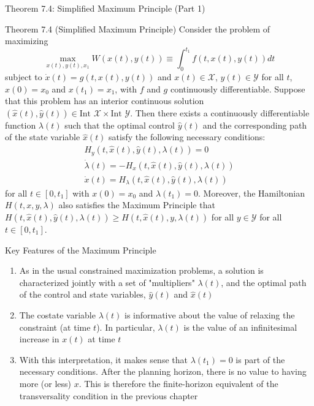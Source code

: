 \documentclass[9pt,aspectratio=169]{beamer}
\newcommand{\X}{\mathcal{X}}
\newcommand{\Y}{\mathcal{Y}}
\begin{document}
\begin{frame}{Theorem 7.4: Simplified Maximum Principle (Part 1)}
\begin{block}{Theorem 7.4 (Simplified Maximum Principle)}
    Consider the problem of maximizing 
    \begin{equation*}
        \max_{x(t),y(t),x_1} W(x(t), y(t)) \equiv \int_0^{t_1} f(t, x(t), y(t))dt    
    \end{equation*}
    subject to $\dot{x}(t) = g(t, x(t), y(t))$ and $x(t) \in \X$, $y(t) \in
    \Y$ for all $t$, $x(0) = x_0$ and $x(t_1) = x_1$, with $f$ and $g$
    continuously differentiable. Suppose that this problem has an interior
    continuous solution $(\hat{x}(t), \hat{y}(t)) \in \text{Int } \X \times
    \text{Int } \Y$. Then there exists a continuously differentiable function
    $\lambda(t)$ such that the optimal control $\hat{y}(t)$ and the
    corresponding path of the state variable $\hat{x}(t)$ satisfy the
    following necessary conditions:
    \begin{align*}
        H_y(t, \hat{x}(t), \hat{y}(t), \lambda(t)) = 0\\
        \dot{\lambda}(t) = -H_x(t, \hat{x}(t), \hat{y}(t), \lambda(t)) \\ 
        \dot{x}(t) = H_\lambda(t, \hat{x}(t), \hat{y}(t), \lambda(t))
    \end{align*}
    for all $t \in [0, t_1]$ with $x(0) = x_0$ and $\lambda(t_1) = 0$.
    Moreover, the Hamiltonian $H(t, x, y, \lambda)$ also satisfies the
    Maximum Principle that $H(t, \hat{x}(t), \hat{y}(t), \lambda(t)) \geq
    H(t, \hat{x}(t), y, \lambda(t))$ for all $y \in \Y$ for all $t \in [0,
    t_1]$.
\end{block}
\end{frame}

\begin{frame}{Key Features of the Maximum Principle}
\begin{enumerate}
    \item As in the usual constrained maximization problems, a solution is
    characterized jointly with a set of "multipliers" $\lambda(t)$, and the
    optimal path of the control and state variables, $\hat{y}(t)$ and
    $\hat{x}(t)$
    
    \item The costate variable $\lambda(t)$ is informative about the value of
    relaxing the constraint (at time $t$). In particular, $\lambda(t)$ is the
    value of an infinitesimal increase in $x(t)$ at time $t$
    
    \item With this interpretation, it makes sense that $\lambda(t_1) = 0$ is
    part of the necessary conditions. After the planning horizon, there is no
    value to having more (or less) $x$. This is therefore the finite-horizon
    equivalent of the transversality condition in the previous chapter
\end{enumerate}
\end{frame}
\end{document}
